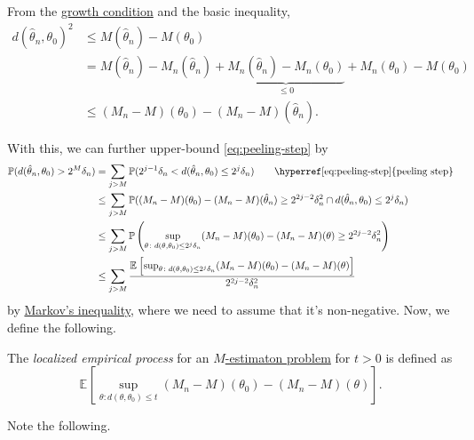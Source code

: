 \begin{note}
	From the \hyperref[def:growth-condition*]{growth condition} and the basic inequality,
	\[
		\begin{split}
			d(\hat{\theta} _n, \theta _0)^2
			 & \leq M(\hat{\theta} _n ) - M(\theta _0)                                                                                                   \\
			 & = M(\hat{\theta} _n) - M_n(\hat{\theta} _n) + \underbrace{M_n(\hat{\theta} _n) - M_n(\theta _0)}_{\leq 0} + M_n(\theta _0) - M(\theta _0) \\
			 & \leq (M_n - M)(\theta _0) - (M_n - M)(\hat{\theta} _n).
		\end{split}
	\]
\end{note}

With this, we can further upper-bound \autoref{eq:peeling-step} by
\begin{align*}
	\mathbb{P} (d(\hat{\theta} _n, \theta _0) > 2^M \delta _n)
	 & = \sum_{j > M} \mathbb{P} (2^{j-1} \delta _n < d(\hat{\theta} _n, \theta _0) \leq 2^j \delta _n)\tag*{\hyperref[eq:peeling-step]{peeling step}}                                        \\
	 & \leq \sum_{j > M} \mathbb{P} ((M_n - M)(\theta _0) - (M_n - M)(\hat{\theta} _n) \geq 2^{2j-2} \delta _n^2 \cap d(\hat{\theta} _n, \theta _0) \leq 2^j \delta _n)                       \\
	 & \leq \sum_{j > M} \mathbb{P} \left( \sup _{\theta \colon d(\theta , \theta _0) \leq 2^j \delta _n} (M_n - M)(\theta _0) - (M_n - M)(\theta ) \geq 2^{2j - 2} \delta _n^2 \right)       \\
	 & \leq \sum_{j > M} \frac{\mathbb{E}_{}\left[\sup _{\theta \colon d(\theta , \theta _0) \leq 2^j \delta _n} (M_n - M)(\theta _0) - (M_n - M)(\theta ) \right] }{2^{2j - 2} \delta _n^2 }
\end{align*}
by \hyperref[lma:Markov-inequality]{Markov's  inequality}, where we need to assume that it's non-negative. Now, we define the following.

\begin{definition}\label{def:localized-EP}
	The \emph{localized empirical process} for an \hyperref[prb:M-estimation]{\(M\)-estimaton problem} for \(t > 0\) is defined as
	\[
		\mathbb{E}_{}\left[\sup _{\theta \colon d(\theta , \theta _0) \leq t} (M_n - M)(\theta _0) - (M_n - M)(\theta ) \right].
	\]
\end{definition}

Note the following.


